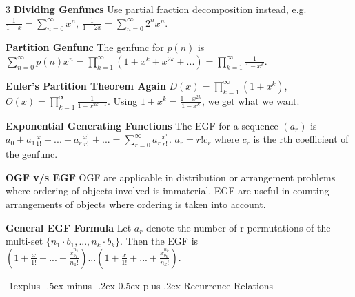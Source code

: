 \documentclass[10pt, landscape]{article}
\makeatletter
\renewcommand{\section}{\@startsection{section}{1}{0mm}%
                                {-1ex plus -.5ex minus -.2ex}%
                                {0.5ex plus .2ex}%
                                {\normalfont\large\bfseries}}
\renewcommand{\section}{\@startsection{section}{2}{0mm}%
                                {-1explus -.5ex minus -.2ex}%
                                {0.5ex plus .2ex}%
                                {\normalfont\normalsize\bfseries}}
\makeatother
\begin{document}
\begin{multicols*}{3}
\textbf{Dividing Genfuncs} Use partial fraction decomposition instead, e.g. $\frac{1}{1-x}=\sum_{n=0}^\infty x^n$, $\frac{1}{1-2x}=\sum_{n=0}^\infty 2^n x^n$.

\textbf{Partition Genfunc} The genfunc for $p(n)$ is $\sum_{n=0}^\infty p(n)x^n=\prod_{k=1}^\infty(1+x^k+x^{2k}+...)=\prod_{k=1}^\infty \frac{1}{1-x^k}$.

\textbf{Euler's Partition Theorem Again} $D(x)=\prod_{k=1}^\infty (1+x^k)$, $O(x)=\prod_{k=1}^\infty \frac{1}{1-x^{2k-1}}$. Using $1+x^k=\frac{1-x^{2k}}{1-x^k}$, we get what we want.

\textbf{Exponential Generating Functions} The EGF for a sequence $(a_r)$ is $a_0+a_1\frac{x}{1!}+...+a_r\frac{x^r}{r!}+...=\sum_{r=0}^\infty a_r\frac{x^r}{r!}$. $a_r=r! c_r$ where $c_r$ is the rth coefficient of the genfunc.

\textbf{OGF v/s EGF} OGF are applicable in distribution or arrangement problems where ordering of objects involved is immaterial. EGF are useful in counting arrangements of objects where ordering is taken into account.

\textbf{General EGF Formula} Let $a_r$ denote the number of r-permutations of the multi-set $\{n_1 \cdot b_1, ... , n_k \cdot b_k\}$. Then the EGF is $(1+\frac{x}{1!}+...+\frac{x^{n_1}_{b_1}}{n_1!})...(1+\frac{x}{1!}+...+\frac{x^{n_k}_{b_k}}{n_k!})$.

\section{Recurrence Relations}





\end{multicols*}
\end{document}
